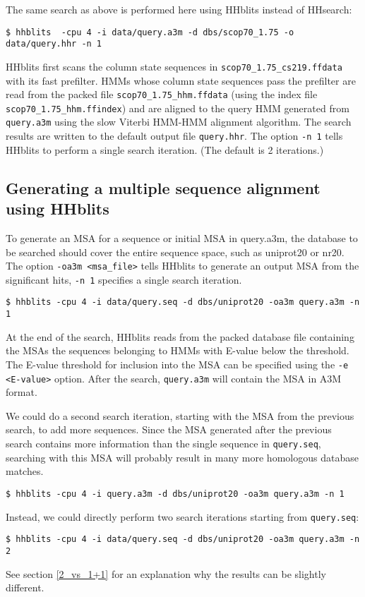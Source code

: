\documentclass[11pt,a4paper]{article}
\begin{document}
The same search as above is performed here using HHblits instead of HHsearch:
\begin{verbatim}
$ hhblits  -cpu 4 -i data/query.a3m -d dbs/scop70_1.75 -o data/query.hhr -n 1
\end{verbatim}

HHblits first scans the column state sequences in \verb`scop70_1.75_cs219.ffdata` with its fast prefilter. HMMs whose column state sequences pass the prefilter are read from the packed file \verb`scop70_1.75_hhm.ffdata` (using the index file \verb`scop70_1.75_hhm.ffindex`) and are aligned to the query HMM generated from \verb`query.a3m` using the slow Viterbi HMM-HMM alignment algorithm. The search results are written to the default output file \verb`query.hhr`. The option \verb`-n 1` tells HHblits to perform a single search iteration. (The default is 2 iterations.)


\subsection{Generating a multiple sequence alignment using HHblits}\label{msa_hhblits}

To generate an MSA for a sequence or initial MSA in query.a3m, the database to be searched should cover the entire sequence space, such as uniprot20 or nr20. The option \verb`-oa3m <msa_file>` tells HHblits to generate an output MSA from the significant hits, \verb`-n 1` specifies a single search iteration.
\begin{verbatim}
$ hhblits -cpu 4 -i data/query.seq -d dbs/uniprot20 -oa3m query.a3m -n 1
\end{verbatim}

At the end of the search, HHblits reads from the packed database file containing the MSAs the sequences belonging to HMMs with E-value below the threshold. The E-value threshold for inclusion into the MSA can be specified using the \verb`-e <E-value>` option. After the search, \verb`query.a3m` will contain the MSA in A3M format.

We could do a second search iteration, starting with the MSA from the previous search, to add more sequences. Since the MSA generated after the previous search contains more information than the single sequence in \verb`query.seq`, searching with this MSA will probably result in many more homologous database matches.
\begin{verbatim}
$ hhblits -cpu 4 -i query.a3m -d dbs/uniprot20 -oa3m query.a3m -n 1
\end{verbatim}
Instead, we could directly perform two search iterations starting from \verb`query.seq`:
\begin{verbatim}
$ hhblits -cpu 4 -i data/query.seq -d dbs/uniprot20 -oa3m query.a3m -n 2 
\end{verbatim}
See section \ref{2_vs_1+1} for an explanation why the results can be slightly different.
\end{document}
